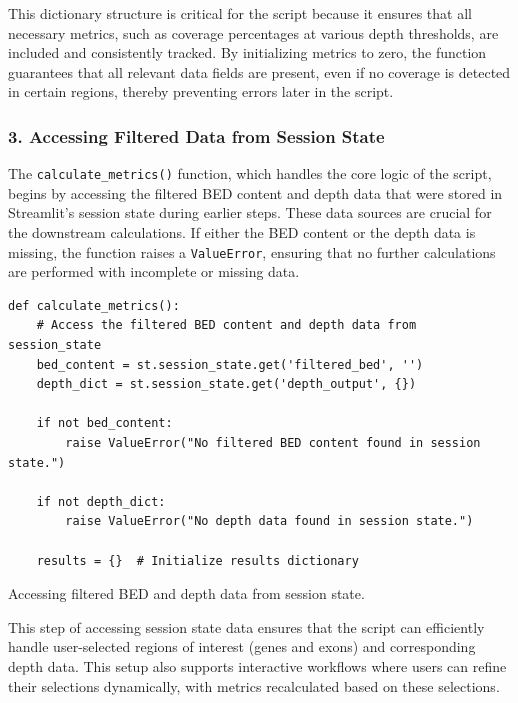 This dictionary structure is critical for the script because it ensures that all necessary metrics, such as coverage percentages at various depth thresholds, are included and consistently tracked. By initializing metrics to zero, the function guarantees that all relevant data fields are present, even if no coverage is detected in certain regions, thereby preventing errors later in the script.

\subsubsection{3. Accessing Filtered Data from Session State}

The \texttt{calculate\_metrics()} function, which handles the core logic of the script, begins by accessing the filtered BED content and depth data that were stored in Streamlit's session state during earlier steps. These data sources are crucial for the downstream calculations. If either the BED content or the depth data is missing, the function raises a \texttt{ValueError}, ensuring that no further calculations are performed with incomplete or missing data.

\begin{longlisting}
\begin{verbatim}
def calculate_metrics():
    # Access the filtered BED content and depth data from session_state
    bed_content = st.session_state.get('filtered_bed', '')
    depth_dict = st.session_state.get('depth_output', {})

    if not bed_content:
        raise ValueError("No filtered BED content found in session state.")

    if not depth_dict:
        raise ValueError("No depth data found in session state.")

    results = {}  # Initialize results dictionary
\end{verbatim}
\caption{Accessing filtered BED and depth data from session state.}
\label{lbl:metrics_access}
\end{longlisting}

This step of accessing session state data ensures that the script can efficiently handle user-selected regions of interest (genes and exons) and corresponding depth data. This setup also supports interactive workflows where users can refine their selections dynamically, with metrics recalculated based on these selections.

